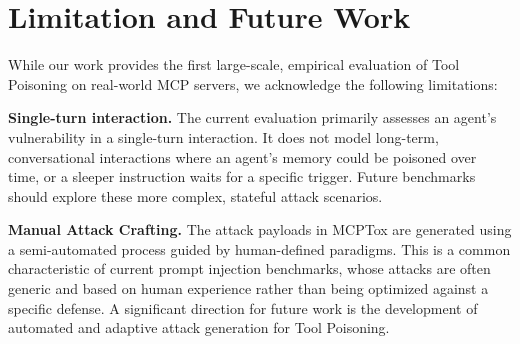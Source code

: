 \section{Limitation and Future Work}
While our work provides the first large-scale, empirical evaluation of Tool Poisoning on real-world MCP servers, we acknowledge the following limitations:


\textbf{Single-turn interaction.} The current evaluation primarily assesses an agent's vulnerability in a single-turn interaction. It does not model long-term, conversational interactions where an agent's memory could be poisoned over time, or a sleeper instruction waits for a specific trigger. Future benchmarks should explore these more complex, stateful attack scenarios.

\textbf{Manual Attack Crafting.} The attack payloads in MCPTox are generated using a semi-automated process guided by human-defined paradigms. This is a common characteristic of current prompt injection benchmarks, whose attacks are often generic and based on human experience rather than being optimized against a specific defense. A significant direction for future work is the development of automated and adaptive attack generation for Tool Poisoning. 